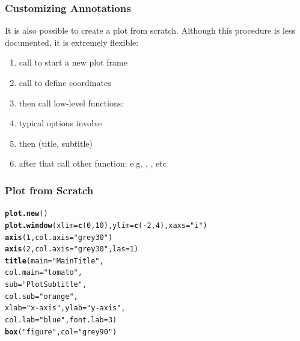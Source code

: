\documentclass[12pt]{beamer}\usepackage[]{graphicx}\usepackage[]{color}
\makeatletter
\newcommand{\hlnum}[1]{\textcolor[rgb]{0.686,0.059,0.569}{#1}}%
\newcommand{\hlstr}[1]{\textcolor[rgb]{0.192,0.494,0.8}{#1}}%
\newcommand{\hlopt}[1]{\textcolor[rgb]{0,0,0}{#1}}%
\newcommand{\hlstd}[1]{\textcolor[rgb]{0.345,0.345,0.345}{#1}}%
\newcommand{\hlkwc}[1]{\textcolor[rgb]{0.333,0.667,0.333}{#1}}%
\newcommand{\hlkwd}[1]{\textcolor[rgb]{0.737,0.353,0.396}{\textbf{#1}}}%
\newenvironment{kframe}{%
 \def\at@end@of@kframe{}%
 \ifinner\ifhmode%
  \def\at@end@of@kframe{\end{minipage}}%
  \begin{minipage}{\columnwidth}%
 \fi\fi%
 \def\FrameCommand##1{\hskip\@totalleftmargin \hskip-\fboxsep
 \colorbox{shadecolor}{##1}\hskip-\fboxsep
     \hskip-\linewidth \hskip-\@totalleftmargin \hskip\columnwidth}%
 \MakeFramed {\advance\hsize-\width
   \@totalleftmargin\z@ \linewidth\hsize
   \@setminipage}}%
 {\par\unskip\endMakeFramed%
 \at@end@of@kframe}
\newenvironment{knitrout}{}{} %
\makeatother
\begin{document}
\begin{frame}
\frametitle{Customizing Annotations}

It is also possible to create a plot from scratch. Although this procedure is less documented, it is extremely flexible:
\begin{enumerate}
  \item call  to start a new plot frame
  \item call  to define coordinates
  \item then call low-level functions:
  \item typical options involve 
  \item then  (title, subtitle)
  \item after that call other function: e.g. , , etc
\end{enumerate}

\end{frame}


\begin{frame}[fragile]
\frametitle{Plot from Scratch}
\begin{knitrout}\footnotesize
{}\color{fgcolor}\begin{kframe}
\begin{alltt}
\hlkwd{plot.new}\hlstd{()}
\hlkwd{plot.window}\hlstd{(}\hlkwc{xlim} \hlstd{=} \hlkwd{c}\hlstd{(}\hlnum{0}\hlstd{,} \hlnum{10}\hlstd{),} \hlkwc{ylim} \hlstd{=} \hlkwd{c}\hlstd{(}\hlopt{-}\hlnum{2}\hlstd{,} \hlnum{4}\hlstd{),} \hlkwc{xaxs} \hlstd{=} \hlstr{"i"}\hlstd{)}
\hlkwd{axis}\hlstd{(}\hlnum{1}\hlstd{,} \hlkwc{col.axis} \hlstd{=} \hlstr{"grey30"}\hlstd{)}
\hlkwd{axis}\hlstd{(}\hlnum{2}\hlstd{,} \hlkwc{col.axis} \hlstd{=} \hlstr{"grey30"}\hlstd{,} \hlkwc{las} \hlstd{=} \hlnum{1}\hlstd{)}
\hlkwd{title}\hlstd{(}\hlkwc{main} \hlstd{=} \hlstr{"Main Title"}\hlstd{,}
      \hlkwc{col.main} \hlstd{=} \hlstr{"tomato"}\hlstd{,}
      \hlkwc{sub} \hlstd{=} \hlstr{"Plot Subtitle"}\hlstd{,}
      \hlkwc{col.sub} \hlstd{=} \hlstr{"orange"}\hlstd{,}
      \hlkwc{xlab} \hlstd{=} \hlstr{"x-axis"}\hlstd{,} \hlkwc{ylab} \hlstd{=} \hlstr{"y-axis"}\hlstd{,}
      \hlkwc{col.lab} \hlstd{=} \hlstr{"blue"}\hlstd{,} \hlkwc{font.lab} \hlstd{=} \hlnum{3}\hlstd{)}
\hlkwd{box}\hlstd{(}\hlstr{"figure"}\hlstd{,} \hlkwc{col} \hlstd{=} \hlstr{"grey90"}\hlstd{)}
\end{alltt}
\end{kframe}
\end{knitrout}
\end{frame}
\end{document}
